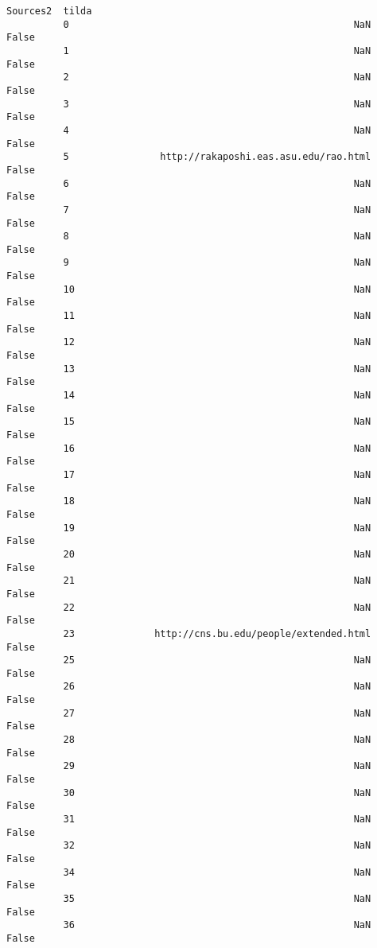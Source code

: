 \documentclass[11pt]{article}
\begin{document}
\begin{Verbatim}[commandchars=\\\{\}]
                                                        Sources2  tilda  
          0                                                  NaN  False  
          1                                                  NaN  False  
          2                                                  NaN  False  
          3                                                  NaN  False  
          4                                                  NaN  False  
          5                http://rakaposhi.eas.asu.edu/rao.html  False  
          6                                                  NaN  False  
          7                                                  NaN  False  
          8                                                  NaN  False  
          9                                                  NaN  False  
          10                                                 NaN  False  
          11                                                 NaN  False  
          12                                                 NaN  False  
          13                                                 NaN  False  
          14                                                 NaN  False  
          15                                                 NaN  False  
          16                                                 NaN  False  
          17                                                 NaN  False  
          18                                                 NaN  False  
          19                                                 NaN  False  
          20                                                 NaN  False  
          21                                                 NaN  False  
          22                                                 NaN  False  
          23              http://cns.bu.edu/people/extended.html  False  
          25                                                 NaN  False  
          26                                                 NaN  False  
          27                                                 NaN  False  
          28                                                 NaN  False  
          29                                                 NaN  False  
          30                                                 NaN  False  
          31                                                 NaN  False  
          32                                                 NaN  False  
          34                                                 NaN  False  
          35                                                 NaN  False  
          36                                                 NaN  False  

\end{Verbatim}
\end{document}
